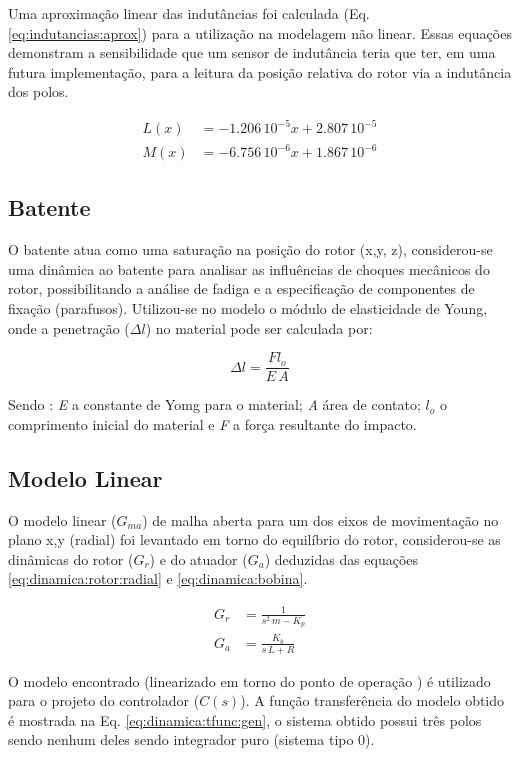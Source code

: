 Uma aproximação linear das indutâncias foi calculada (Eq. \ref{eq:indutancias:aprox}) para a utilização na modelagem não linear. Essas equações demonstram a sensibilidade que um sensor de indutância teria que ter, em uma futura implementação, para a leitura da posição relativa do rotor via a indutância dos polos.

\begin{align}
	L(x) &= -1.206 \,10^{-5} x + 2.807 \, 10^{-5} \\
	M(x) &= -6.756 \,10^{-6} x + 1.867 \, 10^{-6} 
	\label{eq:indutancias:aprox}
\end{align} 

\subsection{Batente}

O batente atua como uma saturação na posição do rotor (x,y, z), considerou-se uma dinâmica ao batente para analisar as influências de choques mecânicos do rotor, possibilitando a análise de fadiga e a especificação de componentes de fixação (parafusos). Utilizou-se no  modelo o módulo de elasticidade de Young, onde a penetração ($\Delta l $) no material pode ser calculada por:

\begin{equation}
	\Delta l =  \frac{F l_o}{E \, A}
\end{equation}

Sendo : \textit{E} a constante de Yomg para o material; \textit{A} área de contato; \textbf{$l_o$ } o comprimento inicial do material e \textit{F} a força resultante do impacto. 


\subsection{Modelo Linear}

O modelo linear ($G_{ma}$) de malha aberta para um dos eixos de movimentação no plano x,y (radial) foi levantado em torno do equilíbrio do rotor, considerou-se as dinâmicas do rotor ($G_r$) e do atuador ($G_a$) deduzidas das equações  \eqref{eq:dinamica:rotor:radial} e \eqref{eq:dinamica:bobina}.

\begin{align}
	G_r &= \frac{1}{s^2 \, m - K_p} \\
	G_a &= \frac{K_b}{s\, L + R}
\end{align}

O modelo encontrado (linearizado em torno do ponto de operação ) é utilizado para o projeto do controlador ($C(s)$). A função transferência do modelo obtido é mostrada na Eq. \eqref{eq:dinamica:tfunc:gen}, o sistema obtido possui três polos sendo nenhum deles sendo integrador puro (sistema tipo 0). 

